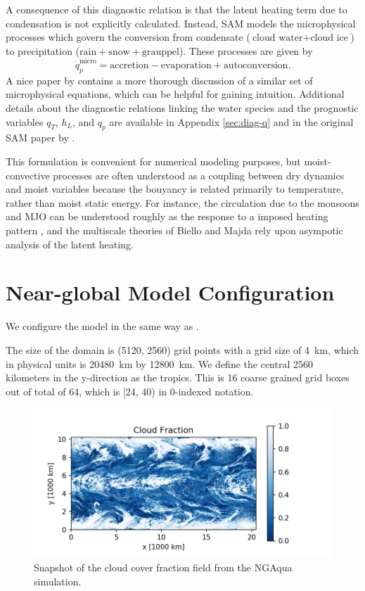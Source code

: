 \documentclass{report}
\begin{document}
A consequence of this diagnostic relation is that the latent
heating term due to condensation is not explicitly calculated. Instead, SAM
models the microphysical processes which govern the conversion from condensate
($\text{cloud water} + \text{cloud ice}$) to precipitation ($\text{rain} +
\text{snow} + \text{grauppel}$). These processes are given by
\[
  \dot{q}_p^{\text{micro}} = \text{accretion} - \text{evaporation} + \text{autoconversion}.
\]
A nice paper by \textcite{hernandez-duenas_minimal_2013} contains a more thorough
discussion of a similar set of microphysical equations, which can be helpful for
gaining intuition. Additional details about the diagnostic relations linking the
water species and the prognostic variables $q_T$, $h_L$, and $q_p$ are available
in Appendix \ref{sec:diag-q} and in the original SAM paper by \textcite{Khairoutdinov2003}.

This formulation is convenient for numerical modeling purposes, but
moist-convective processes are often understood as a coupling between dry
dynamics and moist variables because the bouyancy is related primarily to
temperature, rather than moist static energy.
For instance, the circulation due to the monsoons and MJO can be understood
roughly as the response to a imposed heating pattern \autocite{Gill1980}, and
the multiscale theories of Biello and Majda rely upon asympotic analysis of the
latent heating.

\section{Near-global Model Configuration}
\label{sec:model-config}

We configure the model in the same way as \textcite{Bretherton2015}. 

The size of the domain is (5120, 2560) grid points with a grid size of
\SI{4}{\km}, which in physical units is \SI{20480}{\km} by \SI{12800}{\km}.
We define the central 2560 kilometers in the y-direction as the tropics. 
This is 16 coarse grained grid boxes out of total of 64, which is [24, 40) in
0-indexed notation.

\begin{figure}[ht]
  \centering
  \includegraphics{images/cld.png}
  \caption{\label{fig:cld}Snapshot of the cloud cover fraction field from the NGAqua simulation.}
\end{figure}
\end{document}
